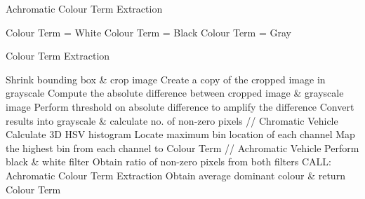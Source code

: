 \begin{algorithm}[!ht]
  \caption{Achromatic Colour Term Extraction}
  \label{algo:achromatic}
  \begin{algorithmic}[1]

    \STATE Colour Term = White
      \STATE Colour Term = Black
  \ELSE
      \STATE Colour Term = Gray
  \ENDIF

  \end{algorithmic}
\end{algorithm}

\begin{algorithm}[!t]
  \caption{Colour Term Extraction}
  \label{algo:colorExtract}
  \begin{algorithmic}[1]
        \STATE Shrink bounding box \& crop image
        \STATE Create a copy of the cropped image in grayscale
        \STATE Compute the absolute difference between cropped image \& grayscale image
        \STATE Perform threshold on absolute difference to amplify the difference
        \STATE Convert results into grayscale \& calculate no. of non-zero pixels
                \STATE // Chromatic Vehicle
                \STATE Calculate 3D HSV histogram
                \STATE Locate maximum bin location of each channel
                \STATE Map the highest bin from each channel to Colour Term
            \ELSE
                \STATE // Achromatic Vehicle
                \STATE Perform black \& white filter
                \STATE Obtain ratio of non-zero pixels from both filters
                \STATE CALL: Achromatic Colour Term Extraction
            \ENDIF
    \ENDFOR
    \STATE Obtain average dominant colour \& return Colour Term
  \end{algorithmic}
\end{algorithm}

